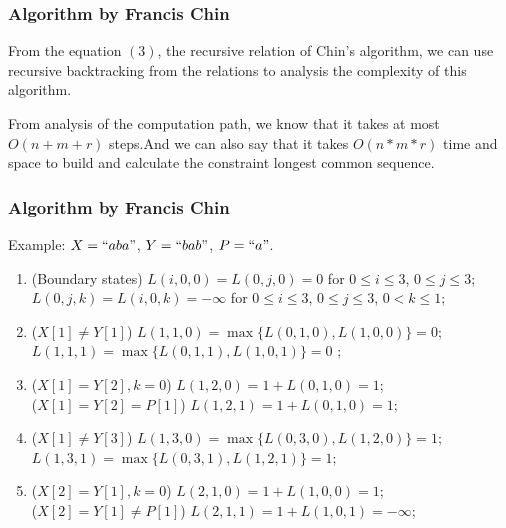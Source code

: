 \documentclass[10pt]{beamer}
\begin{document}
\begin{frame}
  \frametitle{Algorithm by Francis Chin}
  From the equation $(3)$, the recursive relation of Chin's algorithm, we can use recursive backtracking from the relations to analysis the complexity of this algorithm.

  \vskip10pt
  \pause
  From analysis of the computation path, we know that it takes at most $O(n + m + r)$ steps.And we can also say that it takes $O(n*m*r)$ time and space to build and calculate the constraint longest common sequence.
  
\end{frame}

\begin{frame}
  \frametitle{Algorithm by Francis Chin}
  Example: $X=``aba"$, $Y=``bab"$, $P=``a"$.

  \begin{enumerate}
  \item<2-> (Boundary states) $L(i,0,0)=L(0,j,0)=0$ for $0\le i\le 3$, $0\le j\le 3$;
    $L(0, j, k)=L(i,0,k)=-\infty$ for $0\le i\le 3$, $0\le j\le 3$, $0<k\le1$;
  \item<3-> ($X[1]\neq Y[1]$) $L(1,1,0)=\max\{L(0,1,0), L(1,0,0)\}=0$;\\
    $L(1,1,1)=\max\{L(0,1,1), L(1,0,1)\}=0$ ;
  \item<4-> ($X[1]=Y[2], k=0$) $L(1,2,0)=1+L(0,1,0)=1$;\\
    ($X[1]=Y[2]=P[1]$) $L(1,2,1)=1+L(0,1,0)=1$;
  \item<5-> ($X[1]\neq Y[3]$) $L(1,3,0)=\max\{L(0,3,0), L(1,2,0)\} = 1$;\\ $L(1,3,1)=\max\{L(0,3,1), L(1,2,1)\}=1$;
  \item<6-> ($X[2]=Y[1], k=0$) $L(2,1,0) = 1+ L(1,0,0) = 1$; \\
    ($X[2]=Y[1]\neq P[1]$) $L(2,1,1)=1+L(1,0,1)=-\infty$;
  \end{enumerate}
\end{frame}
\end{document}
